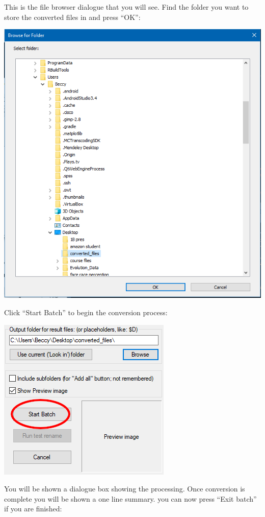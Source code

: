\documentclass[]{book}
\begin{document}
This is the file browser dialogue that you will see. Find the folder you
want to store the converted files in and press ``OK'':

\includegraphics{images/screenshots/irfanview_6a.png}

Click ``Start Batch'' to begin the conversion process:

\includegraphics{images/screenshots/irfanview_7.png}

You will be shown a dialogue box showing the processing. Once conversion
is complete you will be shown a one line summary. you can now press
``Exit batch'' if you are finished:
\end{document}
